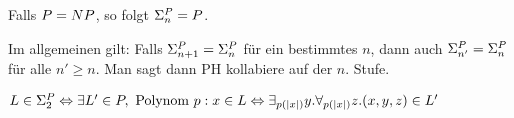 Falls $P = NP$, so folgt $\Sigma_n^{P} = P$.

Im allgemeinen gilt: Falls $\Sigma_{n+1}^{P} = \Sigma_n^{P}$ für ein bestimmtes $n$, dann auch $\Sigma_{n'}^{P} = \Sigma_n^{P}$ für alle $n' \geq n$. Man sagt dann PH kollabiere auf der $n$. Stufe.







\begin{satz}
    
    $L \in \Sigma_2^{P} \Leftrightarrow \\
    \exists L' \in P, \text{ Polynom } p:
    x \in L \Leftrightarrow \exists_{p(|x|)} y . \forall_{p(|x|)} z . (x,y,z) \in L'$

\end{satz}

